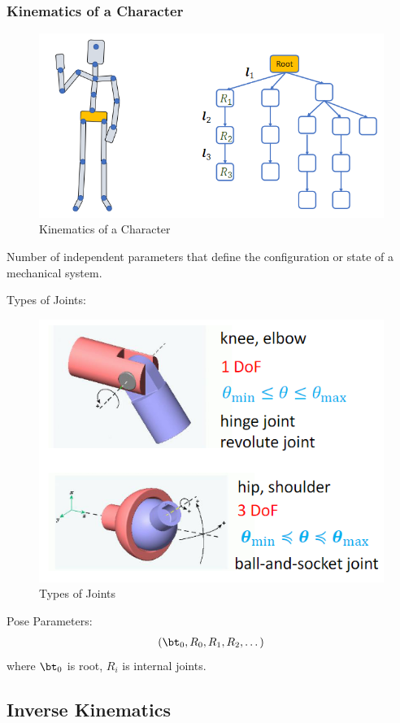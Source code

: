 \subsubsection{Kinematics of a Character}

\begin{figure}[!htb]
    \centering
    \includegraphics[width=0.618\linewidth]{pic/1053/Kinematics of a Character}
    \caption{Kinematics of a Character}
\end{figure}



\begin{definition}
    Number of independent parameters that define the configuration or state of
a mechanical system. 
\end{definition}

Types of Joints:
\begin{figure}[!htb]
    \centering
    \includegraphics[width=0.618\linewidth]{pic/1053/Types of Joints}
    \caption{Types of Joints}
\end{figure}

Pose Parameters: 
\begin{align*}
    (\bt_0, R_0, R_1,R_2,\dots)
\end{align*}
where $\bt_0$ is root, $R_i$ is internal joints.



\subsection{Inverse Kinematics}


